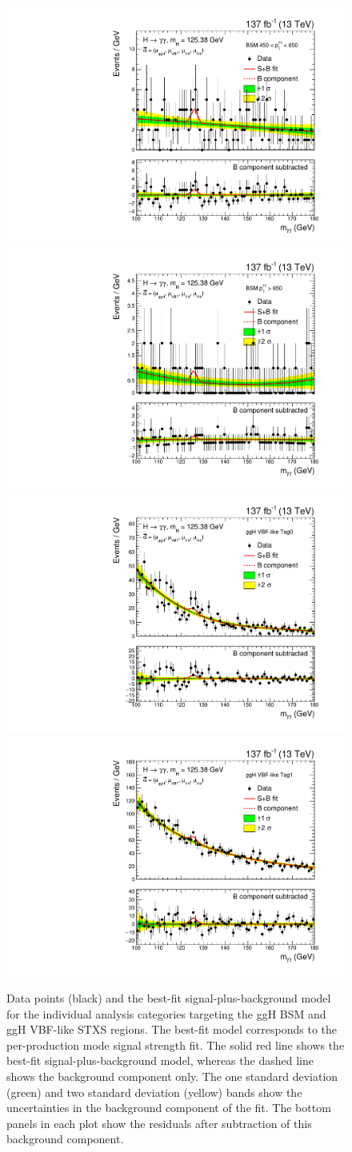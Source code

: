 \begin{figure}
  \includegraphics[width=.32\linewidth]{Figures/app_sb_models/RECO_PTH_450_650_Tag0_CMS_hgg_mass.pdf}
  \includegraphics[width=.32\linewidth]{Figures/app_sb_models/RECO_PTH_GT650_Tag0_CMS_hgg_mass.pdf}
  \includegraphics[width=.32\linewidth]{Figures/app_sb_models/RECO_VBFLIKEGGH_Tag0_CMS_hgg_mass.pdf}
  \includegraphics[width=.32\linewidth]{Figures/app_sb_models/RECO_VBFLIKEGGH_Tag1_CMS_hgg_mass.pdf}
  \caption[Observed diphoton mass distributions: ggH BSM and ggH VBF-like]
  {
    Data points (black) and the best-fit signal-plus-background model for the individual analysis categories targeting the ggH BSM and ggH VBF-like STXS regions. The best-fit model corresponds to the per-production mode signal strength fit. The solid red line shows the best-fit signal-plus-background model, whereas the dashed line shows the background component only. The one standard deviation (green) and two standard deviation (yellow) bands show the uncertainties in the background component of the fit. The bottom panels in each plot show the residuals after subtraction of this background component.
  }
  \label{fig:diphoton_mass_2}
\end{figure}

